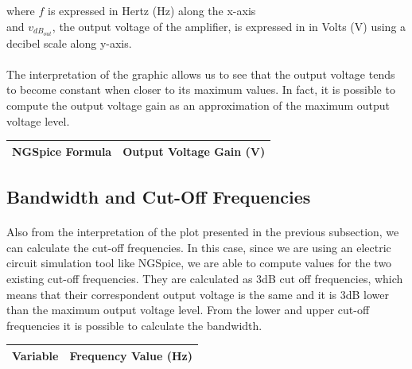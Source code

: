 where $f$ is expressed in Hertz (Hz) along the x-axis\\
and $v_{dB_{out}}$, the output voltage of the amplifier, is expressed in  in Volts (V) using a decibel scale along y-axis.

\paragraph{}
The interpretation of the graphic allows us to see that the output voltage tends to become constant when closer to its maximum values. In fact, it is possible to compute the output voltage gain as an approximation of the maximum output voltage level.


\begin{table}[H] \centering
  \begin{tabular}{|l|r|}
    \hline    
    {\bf NGSpice Formula} & {\bf Output Voltage Gain (V)} \\ \hline
    
  \end{tabular}
 \label{tab:outvoltagegain}
\end{table}


\subsection{Bandwidth and Cut-Off Frequencies}

\paragraph{}
Also from the interpretation of the plot presented in the previous subsection, we can calculate the cut-off frequencies. In this case, since we are using an electric circuit simulation tool like NGSpice, we are able to compute values for the two existing cut-off frequencies. They are calculated as 3dB cut off frequencies, which means that their correspondent output voltage is the same and it is 3dB lower than the maximum output voltage level. From the lower and upper cut-off frequencies it is possible to calculate the bandwidth. 

\begin{table}[H] \centering
  \begin{tabular}{|l|r|}
    \hline    
    {\bf Variable} & {\bf Frequency Value (Hz)} \\ \hline
    
  \end{tabular}
 \label{tab:cutofffreq}
\end{table}

